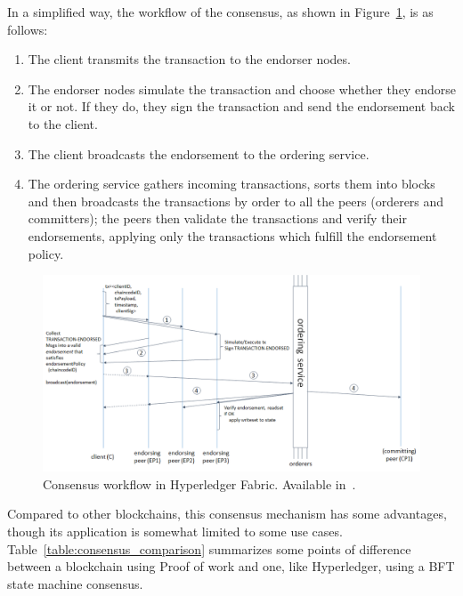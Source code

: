 In a simplified way, the workflow of the consensus, as shown in Figure~\ref{fig:fabric_workflow},  is as follows:
\begin{enumerate}
\item The client transmits the transaction to the endorser nodes.
\item The endorser nodes simulate the transaction and choose whether they endorse it or not. If they do, they sign the transaction and send the endorsement back to the client.
\item The client broadcasts the endorsement to the ordering service.
\item The ordering service gathers incoming transactions, sorts them into blocks and then broadcasts the transactions by order to all the peers (orderers and committers); the peers then validate the transactions and verify their endorsements, applying only the transactions which fulfill the endorsement policy.
\end{enumerate}
\begin{figure}[h]
\centering
\includegraphics[scale=0.5]{media/fabric_workflow.png}
\caption[Consensus workflow in Hyperledger Fabric]{Consensus workflow in Hyperledger Fabric. Available in~\cite{IBMResearch2017}.}
\label{fig:fabric_workflow}
\end{figure}

Compared to other blockchains, this consensus mechanism has some advantages, though its application is somewhat limited to some use cases. Table~\ref{table:consensus_comparison} summarizes some points of difference between a blockchain using Proof of work and one, like Hyperledger, using a BFT state machine consensus.



